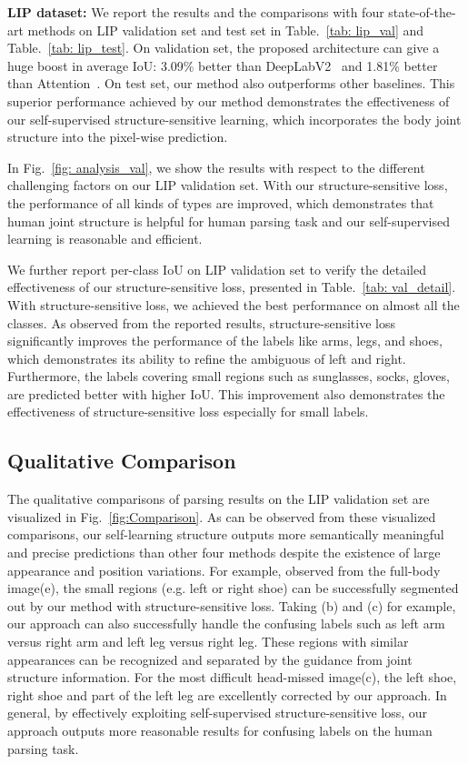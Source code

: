 \documentclass[10pt,twocolumn,letterpaper]{article}
\begin{document}
\textbf{LIP dataset:}
We report the results and the comparisons with four state-of-the-art methods on LIP validation set and test set in Table.~\ref{tab: lip_val} and Table.~\ref{tab: lip_test}. On validation set, the proposed architecture can give a huge boost in average IoU: 3.09\% better than DeepLabV2~\cite{chen2014semantic} and 1.81\% better than Attention~\cite{chen2015attention}. On test set, our method also outperforms other baselines. This superior performance achieved by our method demonstrates the effectiveness of our self-supervised structure-sensitive learning, which incorporates the body joint structure into the pixel-wise prediction.

In Fig.~\ref{fig: analysis_val}, we show the results with respect to the different challenging factors on our LIP validation set. With our structure-sensitive loss, the performance of all kinds of types are improved, which demonstrates that human joint structure is helpful for human parsing task and our self-supervised learning is reasonable and efficient.

We further report per-class IoU on LIP validation set to verify the detailed effectiveness of our structure-sensitive loss, presented in Table.~\ref{tab: val_detail}. With structure-sensitive loss, we achieved the best performance on almost all the classes. As observed from the reported results, structure-sensitive loss significantly improves the performance of the labels like arms, legs, and shoes, which demonstrates its ability to refine the ambiguous of left and right. Furthermore, the labels covering small regions such as sunglasses, socks, gloves, are predicted better with higher IoU. This improvement also demonstrates the effectiveness of structure-sensitive loss especially for small labels.

\subsection{Qualitative Comparison}
The qualitative comparisons of parsing results on the LIP validation set are visualized in Fig.~\ref{fig:Comparison}. As can be observed from these visualized comparisons, our self-learning structure outputs more semantically meaningful and precise predictions than other four methods despite the existence of large appearance and position variations. For example, observed from the full-body image(e), the small regions (e.g. left or right shoe) can be successfully segmented out by our method with structure-sensitive loss. Taking (b) and (c) for example, our approach can also successfully handle the confusing labels such as left arm versus right arm and left leg versus right leg. These regions with similar appearances can be recognized and separated by the guidance from joint structure information. For the most difficult head-missed image(c), the left shoe, right shoe and part of the left leg are excellently corrected by our approach. In general, by effectively exploiting self-supervised structure-sensitive loss, our approach outputs more reasonable results for confusing labels on the human parsing task.  
\end{document}
